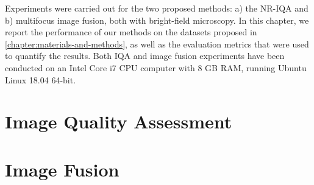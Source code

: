 Experiments were carried out for the two proposed methods: a) the NR-IQA  and b) multifocus image fusion, both with bright-field microscopy. In this chapter, we report the performance of our methods on the datasets proposed in \autoref{chapter:materials-and-methods}, as well as the evaluation metrics that were used to quantify the results. Both IQA and image fusion experiments have been conducted on an Intel Core i7 CPU computer with 8 GB RAM, running Ubuntu Linux 18.04 64-bit.



\section{Image Quality Assessment}


\section{Image Fusion}
